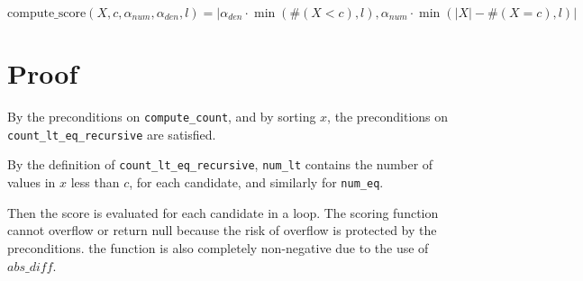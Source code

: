 \documentclass{article}
\begin{document}
\begin{equation}
    \textrm{compute\_score}(X, c, \alpha_{num}, \alpha_{den}, l) = |\alpha_{den} \cdot \min(\#(X < c), l), \alpha_{num} \cdot \min(|X| - \#(X = c), l)|
\end{equation}


\section{Proof}

By the preconditions on \texttt{compute\_count}, 
and by sorting $x$, the preconditions on \texttt{count\_lt\_eq\_recursive} are satisfied.

By the definition of \texttt{count\_lt\_eq\_recursive}, 
\texttt{num\_lt} contains the number of values in $x$ less than $c$, for each candidate, 
and similarly for \texttt{num\_eq}.

Then the score is evaluated for each candidate in a loop.
The scoring function cannot overflow or return null because the risk of overflow is protected 
by the preconditions.
the function is also completely non-negative due to the use of $abs\_diff$.
\end{document}
